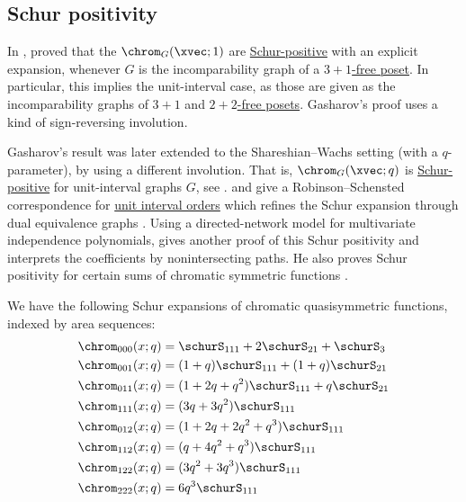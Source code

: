 \subsection[chromaticQuasisymmetricSchurExpansion]{Schur positivity}

In \cite{Gasharov1996},  proved that the
$\chrom_G(\xvec;1)$ are
\hyperref[schurPositiveDefinition]{Schur-positive} with an explicit expansion,
whenever $G$ is the incomparability graph of a
\hyperref[threePlusOneFreePoset]{$3+1$-free poset}.
In particular, this implies the unit-interval case, as those are given as the incomparability graphs
of \hyperref[threePlusOneFreePoset]{$3+1$} and
\hyperref[twoPlusTwoFreePoset]{$2+2$-free posets}.  Gasharov's proof uses a
kind of sign-reversing involution.

Gasharov's result was later extended to the Shareshian--Wachs setting (with a $q$-parameter),
by using a different involution.
That is, $\chrom_G(\xvec;q)$ is
\hyperref[schurPositiveDefinition]{Schur-positive} for unit-interval graphs $G$,
see \cite[Thm.~6.3]{ShareshianWachs2012}.
 and  give a
Robinson--Schensted correspondence for
\hyperref[unitIntervalOrder]{unit interval orders} which refines the Schur
expansion through dual equivalence graphs \cite{KimPylyavskyy2021}.
Using a directed-network model for multivariate independence polynomials,
 gives another proof of this Schur positivity and interprets
the coefficients by nonintersecting paths.  He also proves Schur positivity
for certain sums of chromatic symmetric functions \cite{Siegl2026x}.

\begin{example}
We have the following Schur expansions of chromatic quasisymmetric functions, indexed by area sequences:
\begin{align*}
\chrom_{000}(x;q)&=\schurS_{111}+2 \schurS_{21}+\schurS_{3} \\
\chrom_{001}(x;q)&=(1+q) \schurS_{111}+(1+q) \schurS_{21} \\
\chrom_{011}(x;q)&=(1+2 q+q^2) \schurS_{111}+q \schurS_{21} \\
\chrom_{111}(x;q)&=(3 q+3 q^2) \schurS_{111} \\
\chrom_{012}(x;q)&=(1+2 q+2 q^2+q^3) \schurS_{111} \\
\chrom_{112}(x;q)&=(q+4 q^2+q^3) \schurS_{111} \\
\chrom_{122}(x;q)&=(3 q^2+3 q^3) \schurS_{111} \\
\chrom_{222}(x;q)&=6 q^3 \schurS_{111}
\end{align*}
\end{example}


